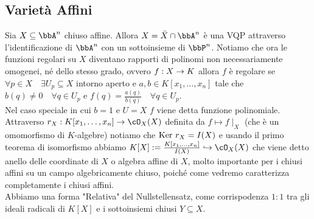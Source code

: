 \documentclass[a4paper,NoNotes,GeneralMath]{stdmdoc}
\newcommand{\hrar}{\hookrightarrow}
\begin{document}
	\subsection*{Varietà Affini}
	Sia $X \subseteq \bbA^n$ chiuso affine. Allora $X = \bar{X} \cap \bbA^n$ è una VQP attraverso l'identificazione di $\bbA^n$ con un sottoinsieme di $\bbP^n$. Notiamo che ora le funzioni regolari su $X$ diventano rapporti di polinomi non necessariamente omogenei, né dello stesso grado, ovvero $f: X \rightarrow K$ allora $f$ è regolare se $\forall p \in X \quad \exists U_p \subseteq X$ intorno aperto e $a,b \in K[x_1, \ldots, x_n]$ tale che $b(q) \neq 0 \quad \forall q \in U_p$ e $f(q) = \frac{a(q)}{b(q)} \quad \forall q \in U_p$. \\
	Nel caso speciale in cui $b=1$ e $U = X$ $f$ viene detta funzione polinomiale. Attraverso $r_X: K[x_1, \ldots, x_n] \rar \cO_X(X)$ definita da $f \mapsto f\mid_X$ (che è un omomorfismo di $K$-algebre) notiamo che $\mbox{Ker } r_X = I(X)$ e usando il primo teorema di isomorfismo abbiamo $K[X] := \frac{K[x_1, \ldots, x_n]}{I(X)} \hrar \cO_X(X)$ che viene detto anello delle coordinate di $X$ o algebra affine di $X$, molto importante per i chiusi affini su un campo algebricamente chiuso, poiché come vedremo caratterizza completamente i chiusi affini. \\
	Abbiamo una forma "Relativa" del Nullstellensatz, come corrispodenza $1:1$ tra gli ideali radicali di $K[X]$ e i sottoinsiemi chiusi $Y \subseteq X$.
	
\end{document}
